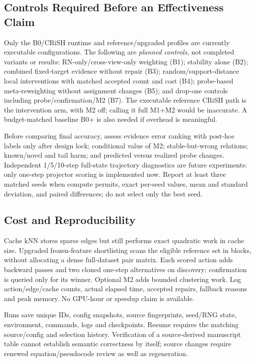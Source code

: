 \documentclass[conference]{IEEEtran}
\begin{document}
\subsection{Controls Required Before an Effectiveness Claim}
Only the B0/CRiSH runtime and reference/upgraded profiles are currently executable configurations. The following are \emph{planned controls}, not completed variants or results: RN-only/cross-view-only weighting (B1); stability alone (B2); combined fixed-target evidence without repair (B3); random/support-distance local interventions with matched accepted count and cost (B4); probe-based meta-reweighting without assignment changes (B5); and drop-one controls including probe/confirmation/M2 (B7). The executable reference CRiSH path is the intervention arm, with M2 off; calling it full M1+M2 would be inaccurate. A budget-matched baseline B0+ is also needed if overhead is meaningful.

Before comparing final accuracy, assess evidence error ranking with post-hoc labels only after design lock; conditional value of M2; stable-but-wrong relations; known/novel and tail harm; and predicted versus realized probe changes. Independent 1/5/10-step full-state trajectory diagnostics are future experiments: only one-step projector scoring is implemented now. Report at least three matched seeds when compute permits, exact per-seed values, mean and standard deviation, and paired differences; do not select only the best seed.

\subsection{Cost and Reproducibility}
Cache kNN stores sparse edges but still performs exact quadratic work in cache size. Upgraded frozen-feature shortlisting scans the eligible reference set in blocks, without allocating a dense full-dataset pair matrix. Each scored action adds backward passes and two cloned one-step alternatives on discovery; confirmation is queried only for its winner. Optional M2 adds bounded clustering work. Log action/edge/cache counts, actual elapsed time, accepted repairs, fallback reasons and peak memory. No GPU-hour or speedup claim is available.

Runs save unique IDs, config snapshots, source fingerprints, seed/RNG state, environment, commands, logs and checkpoints. Resume requires the matching source/config and selection history. Verification of a source-derived manuscript table cannot establish semantic correctness by itself; source changes require renewed equation/pseudocode review as well as regeneration.
\end{document}
